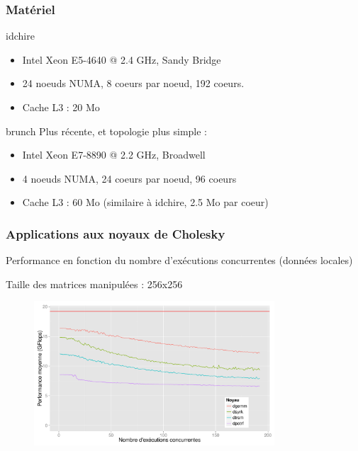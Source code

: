 \documentclass[xcolor={usenames,dvipsnames,svgnames,table}, aspectratio=43]{beamer}
\begin{document}
\begin{frame}
\frametitle{Matériel}

\begin{block}{idchire}
    \begin{itemize}
\item Intel Xeon E5-4640 @ 2.4 GHz, Sandy Bridge
\item 24 noeuds NUMA, 8 coeurs par noeud, 192 coeurs.
\item Cache L3 : 20 Mo
    \end{itemize}
\end{block}

\begin{block}{brunch}
  Plus récente, et topologie plus simple :
  \begin{itemize}
    \item Intel Xeon E7-8890 @ 2.2 GHz, Broadwell
    \item 4 noeuds NUMA, 24 coeurs par noeud, 96 coeurs
    \item Cache L3 : 60 Mo (similaire à idchire, 2.5 Mo par coeur)
  \end{itemize}
\end{block}

\end{frame}



\begin{frame}
\frametitle{Applications aux noyaux de Cholesky}

Performance en fonction du nombre d'exécutions concurrentes (données locales)

Taille des matrices manipulées : 256x256
\begin{figure}
  \centering
  \includegraphics[width=0.8\textwidth]{graph/kernel_256_local_idchire.pdf}
\end{figure}

\end{frame}
\end{document}

